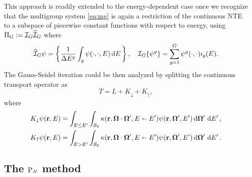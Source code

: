 \begin{remark}\label{rem:MGSI}
	This approach is readily extended to the energy-dependent case once we recognize that the multigroup system
	\eqref{eq:mg} is again a restriction of the continuous NTE to a subspace of piecewise constant functions with respect
	 to energy, using $\Projop[G] := \PiG\PihG$ where
	$$
		\PihG\psi = \left\{\frac{1}{\Delta E^{g}}\int_{g}\psi(\cdot,\cdot,E)\,\d{E}\right\},\quad
		\PiG\{\psi^g\} = \sum_{g=1}^G \psi^g(\cdot,\cdot)\imath_g(E).
	$$
	The Gauss-Seidel iteration could be then analyzed by splitting the continuous transport operator as
	$$
		T = L + K_\downarrow + K_\uparrow,
	$$
	where
	$$
	\begin{aligned}
		K_\downarrow\psi(\br,E) &= \intE[']{E \leq E'}{}{
		\intA[']{\kappa(\br,\bomega\cdot\bomega',E\sla E')\psi(\br,\bomega',E')}},\\
		K_\uparrow\psi(\br,E) &= \intE[']{E > E'}{}{
		\intA[']{\kappa(\br,\bomega\cdot\bomega',E\sla E')\psi(\br,\bomega',E')}}.
\end{aligned}
	$$
\end{remark}





\subsection{The $\PN$ method}\label{sec:PN}

